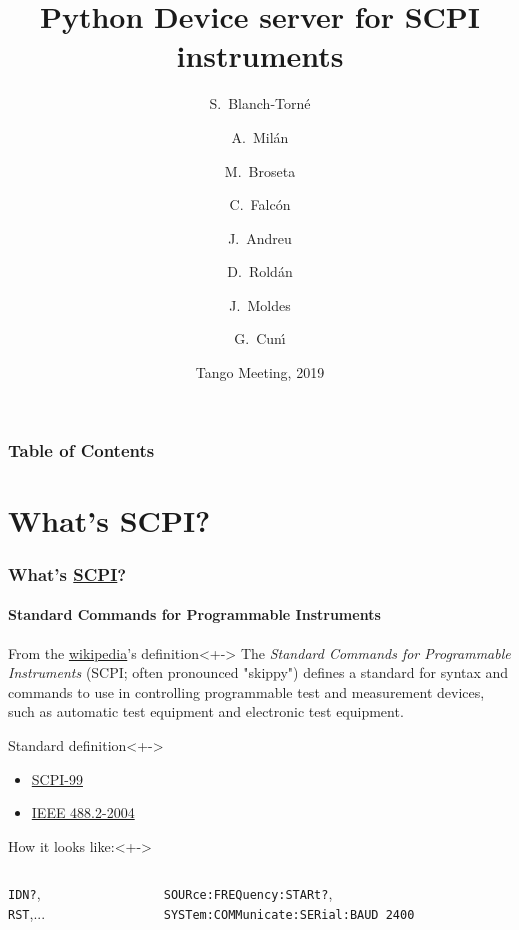 \documentclass{beamer}
\title[Skippy]
  {Python Device server for SCPI instruments}
\author[Sergi Blanch-Torn\'e] %
{S.~Blanch-Torn\'e\inst{1} \and A.~Mil\'an\inst{2} \and M.~Broseta\inst{1} \and C.~Falc\'on\inst{1} \and J.~Andreu\inst{1} \and D.~Rold\'an\inst{1} \and J.~Moldes\inst{1} \and G.~Cun\'{\i}\inst{1}}
\institute[ALBA Synchrotron] %
{
  \inst{1}%
  ALBA Synchrotron, CELLS\\
  Cerdanyola del Vall\'es
  \and
  \inst{2}%
  MAX IV Laboratory\\
  Lund
}
\date[Hamburg 2019] %
{Tango Meeting, 2019}
\begin{document}
\frame{\titlepage}

\begin{frame}
\frametitle{Table of Contents}
\tableofcontents%
\end{frame}

% 

\section{What's SCPI?}

\begin{frame}
  \frametitle{What's \href{https://en.wikipedia.org/wiki/Standard_Commands_for_Programmable_Instruments}{SCPI}?}
  \framesubtitle{Standard Commands for Programmable Instruments}
  \begin{block}{From the \href{https://en.wikipedia.org/wiki/Standard_Commands_for_Programmable_Instruments}{wikipedia}'s definition}<+->
    The \emph{Standard Commands for Programmable Instruments} (SCPI; often pronounced "skippy") defines a standard for syntax and commands to use in controlling programmable test and measurement devices, such as automatic test equipment and electronic test equipment.
  \end{block}
  \begin{alertblock}{Standard definition}<+->
    \begin{itemize}
      \item \textcolor{AlbaBlue}{\href{http://www.ivifoundation.org/docs/scpi-99.pdf}{SCPI-99}}
      \item \textcolor{AlbaBlue}{\href{http://dx.doi.org/10.1109/IEEESTD.2004.95390}{IEEE 488.2-2004}}
    \end{itemize}
  \end{alertblock}
  \begin{exampleblock}{How it looks like:}<+->
    \begin{columns}
      \begin{column}{0.18\textwidth}
        {\tt *IDN?},\\
        {\tt *RST},...
      \end{column}
      \begin{column}{0.60\textwidth}
	\textcolor{AlbaBlue}{{\tt SOURce:FREQuency:STARt?}, \\{\tt SYSTem:COMMunicate:SERial:BAUD 2400}}
      \end{column}
    \end{columns}
  \end{exampleblock}
\end{frame}
  
\end{document}
